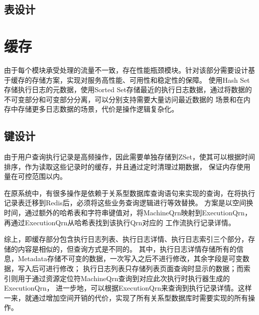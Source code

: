 \subsection{表设计}

\section{缓存}
由于每个模块承受处理的流量不一致，存在性能瓶颈模块。针对该部分需要设计基于缓存的存储方案，实现对服务高性能、可用性和稳定性的保障。
使用Hash Set存储执行日志的元数据，使用Sorted Set存储最近的执行日志数据，通过将数据的不可变部分和可变部分分离，可以分别支持需要大量访问最近数据的
场景和在内存中存储更多日志数据的场景，代价是操作逻辑复杂化。

%
%
%
%
%
%
%
%
%
%



\subsection{键设计}
由于用户查询执行记录是高频操作，因此需要单独存储到ZSet，使其可以根据时间排序，作为读取这些记录时的缓存，并且通过定时清理过期数据，
保证内存使用量在可控范围以内\cite{zw7}。

在原系统中，有很多操作是依赖于关系型数据库查询语句来实现的查询，在将执行记录表迁移到Redis后，必须将这些业务查询逻辑进行等效替换。
方案是以空间换时间，通过额外的哈希表和字符串键值对，将MachineQrn映射到ExecutionQrn，再通过ExecutionQrn从哈希表找到该执行Qrn对应的
工作流执行记录详情\cite{zw6}。

综上，即缓存部分包含执行日志列表、执行日志详情、执行日志索引三个部分，存储的内容是相似的，但查询方式是不同的。
其中，执行日志详情存储所有的信息，Metadata存储不可变的数据，一次写入之后不进行修改，其余字段是可变数据，写入后可进行修改；
执行日志列表只存储列表页面查询时显示的数据；而索引则用于通过资源定位符MachineQrn查询到对应此次执行时执行器生成的ExecutionQrn，
进一步地，可以根据ExecutionQrn来查询到执行记录详情。这样一来，就通过增加空间开销的代价，实现了所有关系型数据库时需要实现的所有操作。

